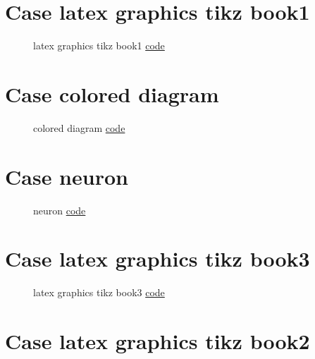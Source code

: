 \documentclass{article}
\begin{document}
\section{Case latex graphics tikz book1}

\begin{figure}[H]
    \centering
    
    \caption{latex graphics tikz book1 \href{https:/github.com/cauliyang/learn_tikz/blob/main/source/latex_graphics_tikz_book1.tex}{code} }
    \label{fig:latex graphics tikz book1}
\end{figure}

\section{Case colored diagram}

\begin{figure}[H]
    \centering
    
    \caption{colored diagram \href{https:/github.com/cauliyang/learn_tikz/blob/main/source/colored_diagram.tex}{code} }
    \label{fig:colored diagram}
\end{figure}

\section{Case neuron}

\begin{figure}[H]
    \centering
    
    \caption{neuron \href{https:/github.com/cauliyang/learn_tikz/blob/main/source/neuron.tex}{code} }
    \label{fig:neuron}
\end{figure}

\section{Case latex graphics tikz book3}

\begin{figure}[H]
    \centering
    
    \caption{latex graphics tikz book3 \href{https:/github.com/cauliyang/learn_tikz/blob/main/source/latex_graphics_tikz_book3.tex}{code} }
    \label{fig:latex graphics tikz book3}
\end{figure}

\section{Case latex graphics tikz book2}
\end{document}
